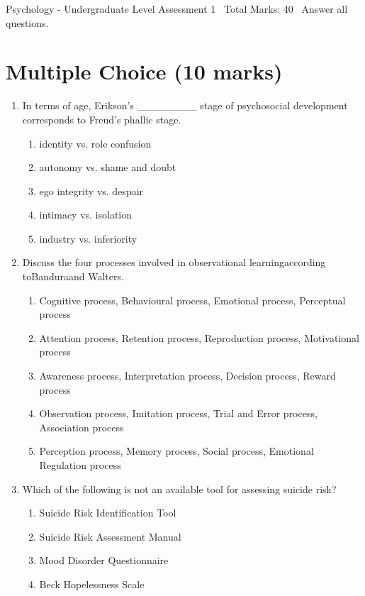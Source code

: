 \documentclass[12pt]{article}
\begin{document}
\begin{center}
Psychology - Undergraduate Level Assessment 1 \
Total Marks: 40 \
Answer all questions.
\end{center}

\section*{Multiple Choice (10 marks)}
\begin{enumerate}[label=\arabic*.]
\item In terms of age, Erikson's \_\_\_\_\_\_\_\_ stage of psychosocial development corresponds to
Freud's phallic stage.
\begin{enumerate}[label=(\alph*)]
    \item identity vs. role confusion
    \item autonomy vs. shame and doubt
    \item ego integrity vs. despair
    \item intimacy vs. isolation
    \item industry vs. inferiority
\end{enumerate}
\item Discuss the four processes involved in observational learningaccording toBanduraand
Walters.
\begin{enumerate}[label=(\alph*)]
    \item Cognitive process, Behavioural process, Emotional process, Perceptual process
    \item Attention process, Retention process, Reproduction process, Motivational process
    \item Awareness process, Interpretation process, Decision process, Reward process
    \item Observation process, Imitation process, Trial and Error process, Association process
    \item Perception process, Memory process, Social process, Emotional Regulation process
\end{enumerate}
\item Which of the following is not an available tool for assessing suicide risk?
\begin{enumerate}[label=(\alph*)]
    \item Suicide Risk Identification Tool
    \item Suicide Risk Assessment Manual
    \item Mood Disorder Questionnaire
    \item Beck Hopelessness Scale

\end{enumerate}
\end{enumerate}
\end{document}
